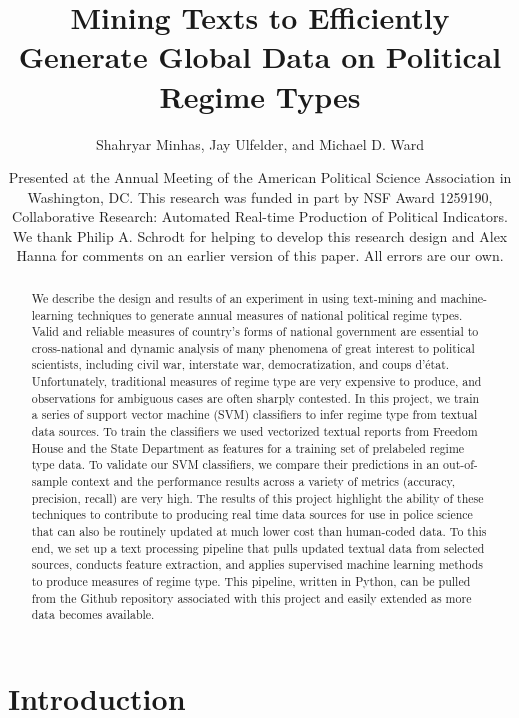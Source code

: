 \documentclass[pdftex,12pt,fullpage,oneside]{amsart}
\title{Mining Texts to Efficiently Generate Global Data on Political Regime Types}
\author{Shahryar Minhas, Jay Ulfelder, and Michael D. Ward}
\date{Presented at the Annual Meeting of the American Political Science Association in Washington, DC. This research was funded in part by NSF Award 1259190, Collaborative Research: Automated Real-time Production of Political Indicators. We thank Philip A. Schrodt for helping to develop this research design and Alex Hanna for comments on an earlier version of this paper. All errors are our own.}
\begin{document}
\maketitle

\singlespacing
\begin{abstract}
We describe the design and results of an experiment in using text-mining and machine-learning techniques to generate annual measures of national political regime types. Valid and reliable measures of country's forms of national government are essential to cross-national and dynamic analysis of many phenomena of great interest to political scientists, including civil war, interstate war, democratization, and coups d'\'{e}tat. Unfortunately, traditional measures of regime type are very expensive to produce, and observations for ambiguous cases are often sharply contested. In this project, we train a series of support vector machine (SVM) classifiers to infer regime type from textual data sources. To train the classifiers we used vectorized textual reports from Freedom House and the State Department as features for a training set of prelabeled regime type data. To validate our SVM classifiers, we compare their predictions in an out-of-sample context and the performance results across a variety of metrics (accuracy, precision, recall) are very high. The results of this project highlight the ability of these techniques to contribute to producing real time data sources for use in police science that can also be routinely updated at much lower cost than human-coded data. To this end, we set up a text processing pipeline that pulls updated textual data from selected sources, conducts feature extraction, and applies supervised machine learning methods to produce measures of regime type. This pipeline, written in Python, can be pulled from the Github repository associated with this project and easily extended as more data becomes available.
\end{abstract} 

\newpage
\newpage\setcounter{page}{1} 
\doublespacing

\section{Introduction}
\end{document}
